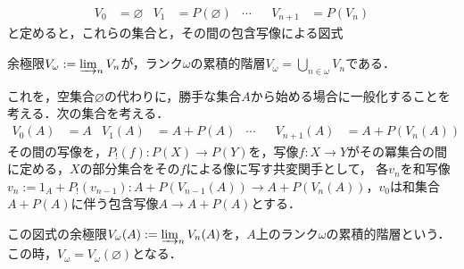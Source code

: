 \documentclass[uplatex, 12pt, dvipdfmx]{jsarticle}
\begin{document}
\begin{example}
    \begin{align*}
        V_0&=\varnothing & V_1&=P(\varnothing) &\cdots& & V_{n+1}&=P(V_n)
    \end{align*}
    と定めると，これらの集合と，その間の包含写像による図式
    \begin{center}
    \end{center}
    余極限$V_\omega:=\varinjlim_nV_n$が，ランク$\omega$の累積的階層$V_\omega=\bigcup_{n\in\omega}V_n$である．

    これを，空集合$\varnothing$の代わりに，勝手な集合$A$から始める場合に一般化することを考える．次の集合を考える．
    \begin{align*}
        V_0(A)&=A & V_1(A)&=A+P(A) &\cdots& & V_{n+1}(A)&=A+P(V_n(A))
    \end{align*}
    その間の写像を，$P_!(f):P(X)\to P(Y)$を，写像$f:X\to Y$がその冪集合の間に定める，$X$の部分集合をその$f$による像に写す共変関手として，
    各$v_n$を和写像$v_n:=1_A+P_!(v_{n-1}):A+P(V_{n-1}(A))\to A+P(V_n(A))$，$v_0$は和集合$A+P(A)$に伴う包含写像$A\to A+P(A)$とする．
    \begin{center}
    \end{center}
    この図式の余極限$V_\omega(A):=\varinjlim_nV_n(A)$を，$A$上のランク$\omega$の累積的階層という．この時，$V_\omega=V_\omega(\varnothing)$となる．


\end{example}
\end{document}
